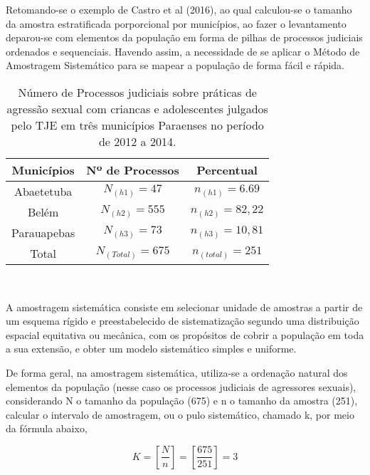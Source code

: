 Retomando-se o exemplo de Castro et al (2016), ao qual calculou-se o tamanho da
amostra estratificada porporcional por municípios, ao fazer o levantamento deparou-se com elementos da população em forma de pilhas de processos judiciais ordenados
e sequenciais. Havendo assim, a necessidade de se aplicar o Método de Amostragem
Sistemático para se mapear a população de forma fácil e rápida.


\begin{table}[!htb]
    \centering
    {
    \caption{Número de Processos judiciais sobre práticas de agressão sexual com criancas e
adolescentes julgados pelo TJE em três municípios Paraenses no período de 2012 a 2014.}
    \label{amostras estratificada}
    \vspace{0.1cm}
\begin{tabular}{c|c|c}
  \hline\hline
  Municípios   & Nº de Processos &  Percentual \\
  \hline\hline
   Abaetetuba  & $N_{(h1)}=47$     & $n_{(h1)}= 6.69$        \\
   Belém       & $N_{(h2)}=555$    & $n_{(h2)}= 82,22$       \\
   Parauapebas & $N_{(h3)}=73$     & $n_{(h3)}= 10,81$       \\
   \hline\hline 
   Total       & $N_{(Total)}=675$ & $n_{(total)}=251$ \\ 
  \hline\hline
\end{tabular}}
\\
\hspace{-1.0cm}
\end{table}



A amostragem sistemática consiste em selecionar unidade de amostras a partir
de um esquema rígido e preestabelecido de sistematização segundo uma distribuição
espacial equitativa ou mecânica, com os propósitos de cobrir a população em toda
a sua extensão, e obter um modelo sistemático simples e uniforme.
\vskip0.3cm

De forma geral, na amostragem sistemática, utiliza-se a ordenação natural dos
elementos da população (nesse caso os processos judiciais de agressores sexuais),
considerando N o tamanho da população (675) e n o tamanho da amostra (251),
calcular o intervalo de amostragem, ou o pulo sistemático, chamado k, por meio da
fórmula abaixo,

\begin{equation}
K= \left[ \frac{N}{n} \right]= \left[ \frac{675}{251} \right] = 3
\end{equation}

